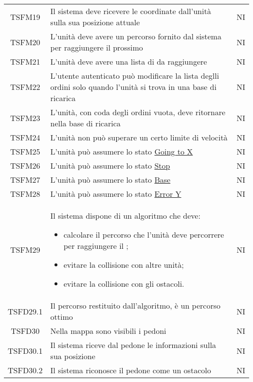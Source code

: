 \begin{longtable}[h!] { c  m{12cm} c}
		TSFM19 & Il sistema deve ricevere le coordinate dall'unità sulla sua posizione attuale & NI \\

		TSFM20 & L'unità deve avere un percorso fornito dal sistema per raggiungere il prossimo \glock{POI} & NI \\

		TSFM21 & L'unità deve avere una lista di \glock{POI} da raggiungere & NI \\

		TSFM22  & L'utente autenticato può modificare la lista deglli ordini solo quando l'unità si trova in una base di ricarica & NI \\

		TSFM23  & L'unità, con coda degli ordini vuota, deve ritornare nella base di ricarica & NI \\

		TSFM24  & L'unità non può superare un certo limite di velocità & NI \\

		TSFM25 & L'unità può assumere lo stato \underline{Going to X} & NI \\
		TSFM26 & L'unità può assumere lo stato \underline{Stop} & NI \\
		TSFM27 & L'unità può assumere lo stato \underline{Base} & NI \\
		TSFM28 & L'unità può assumere lo stato \underline{Error Y} & NI \\
		TSFM29  & Il sistema dispone di un algoritmo che deve:
				\begin{itemize}
					\item calcolare il percorso che l'unità deve percorrere per raggiungere il \glock{POI};
					\item evitare la collisione con altre unità;
					\item evitare la collisione con gli ostacoli.
				\end{itemize}
										& NI \\

		TSFD29.1  & Il percorso restituito dall'algoritmo, è un percorso ottimo & NI\\

		TSFD30 & Nella mappa sono visibili i pedoni & NI \\

		TSFD30.1 & Il sistema riceve dal pedone le informazioni sulla sua posizione & NI\\

		TSFD30.2  & Il sistema riconosce il pedone come un ostacolo & NI \\


\end{longtable}

